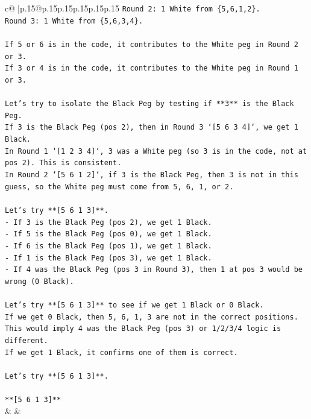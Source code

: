 \documentclass{article}
\begin{document}
{\begin{supertabular}{c@{$\;$}|p{.15\linewidth}@{}p{.15\linewidth}p{.15\linewidth}p{.15\linewidth}p{.15\linewidth}p{.15\linewidth}}
{{{\texttt{Round 2: 1 White from \{5,6,1,2\}.} \\
\texttt{Round 3: 1 White from \{5,6,3,4\}.} \\
\\ 
\texttt{If 5 or 6 is in the code, it contributes to the White peg in Round 2 or 3.} \\
\texttt{If 3 or 4 is in the code, it contributes to the White peg in Round 1 or 3.} \\
\\ 
\texttt{Let's try to isolate the Black Peg by testing if **3** is the Black Peg.} \\
\texttt{If 3 is the Black Peg (pos 2), then in Round 3 `{[}5 6 3 4{]}`, we get 1 Black.} \\
\texttt{In Round 1 `{[}1 2 3 4{]}`, 3 was a White peg (so 3 is in the code, not at pos 2). This is consistent.} \\
\texttt{In Round 2 `{[}5 6 1 2{]}`, if 3 is the Black Peg, then 3 is not in this guess, so the White peg must come from 5, 6, 1, or 2.} \\
\\ 
\texttt{Let's try **{[}5 6 1 3{]}**.} \\
\texttt{{-} If 3 is the Black Peg (pos 2), we get 1 Black.} \\
\texttt{{-} If 5 is the Black Peg (pos 0), we get 1 Black.} \\
\texttt{{-} If 6 is the Black Peg (pos 1), we get 1 Black.} \\
\texttt{{-} If 1 is the Black Peg (pos 3), we get 1 Black.} \\
\texttt{{-} If 4 was the Black Peg (pos 3 in Round 3), then 1 at pos 3 would be wrong (0 Black).} \\
\\ 
\texttt{Let's try **{[}5 6 1 3{]}** to see if we get 1 Black or 0 Black.} \\
\texttt{If we get 0 Black, then 5, 6, 1, 3 are not in the correct positions. This would imply 4 was the Black Peg (pos 3) or 1/2/3/4 logic is different.} \\
\texttt{If we get 1 Black, it confirms one of them is correct.} \\
\\ 
\texttt{Let's try **{[}5 6 1 3{]}**.} \\
\\ 
\texttt{**{[}5 6 1 3{]}**} \\
            }
        }
    }
    & & \\ \\


\end{supertabular}}
\end{document}
